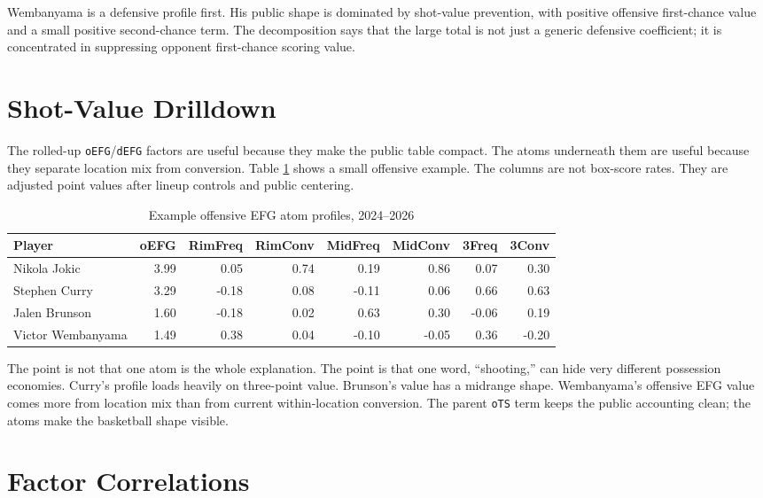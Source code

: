 \documentclass[11pt]{article}
\begin{document}
Wembanyama is a defensive profile first.  His public shape is dominated by
shot-value prevention, with positive offensive first-chance value and a small
positive second-chance term.  The decomposition says that the large total is not
just a generic defensive coefficient; it is concentrated in suppressing
opponent first-chance scoring value.

\section{Shot-Value Drilldown}

The rolled-up \texttt{oEFG}/\texttt{dEFG} factors are useful because they make
the public table compact.  The atoms underneath them are useful because they
separate location mix from conversion.  Table \ref{tab:shotatoms} shows a small
offensive example.  The columns are not box-score rates.  They are adjusted
point values after lineup controls and public centering.

\begin{table}[h]
\centering
\caption{Example offensive EFG atom profiles, 2024--2026}
\label{tab:shotatoms}
\begin{tabular}{lrrrrrrr}
\toprule
Player & oEFG & RimFreq & RimConv & MidFreq & MidConv & 3Freq & 3Conv\\
\midrule
Nikola Jokic & 3.99 & 0.05 & 0.74 & 0.19 & 0.86 & 0.07 & 0.30\\
Stephen Curry & 3.29 & -0.18 & 0.08 & -0.11 & 0.06 & 0.66 & 0.63\\
Jalen Brunson & 1.60 & -0.18 & 0.02 & 0.63 & 0.30 & -0.06 & 0.19\\
Victor Wembanyama & 1.49 & 0.38 & 0.04 & -0.10 & -0.05 & 0.36 & -0.20\\
\bottomrule
\end{tabular}
\end{table}

The point is not that one atom is the whole explanation.  The point is that one
word, ``shooting,'' can hide very different possession economies.  Curry's
profile loads heavily on three-point value.  Brunson's value has a midrange
shape.  Wembanyama's offensive EFG value comes more from location mix than from
current within-location conversion.  The parent \texttt{oTS} term keeps the
public accounting clean; the atoms make the basketball shape visible.

\section{Factor Correlations}
\end{document}
